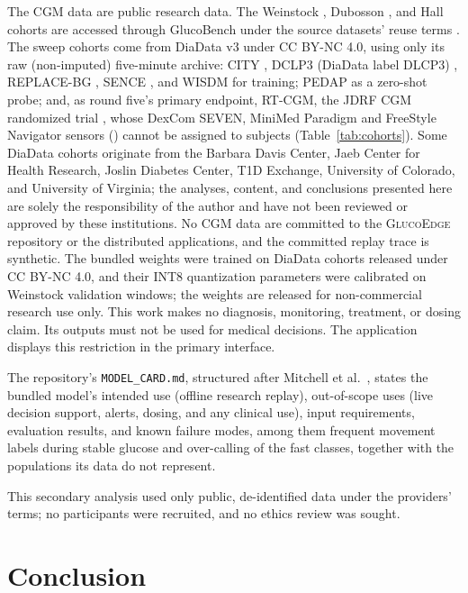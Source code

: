 \documentclass[10pt,twocolumn]{article}
\newcommand{\project}{\textsc{GlucoEdge}\xspace}
\begin{document}
The CGM data are public research data. The Weinstock
\cite{weinstock2016risk}, Dubosson \cite{dubosson2018d1namo}, and Hall
\cite{hall2018glucotypes} cohorts are accessed through GlucoBench under the
source datasets' reuse terms \cite{sergazinov2024glucobench}. The sweep
cohorts come from DiaData v3 \cite{cinar2026diadata} under CC BY-NC 4.0,
using only its raw (non-imputed) five-minute archive: CITY
\cite{laffel2020city}, DCLP3 (DiaData label DLCP3) \cite{brown2019closedloop},
REPLACE-BG \cite{aleppo2017replacebg}, SENCE \cite{sence2021cgm}, and WISDM
\cite{pratley2020wisdm} for training; PEDAP \cite{wadwa2023pedap} as a
zero-shot probe; and, as round five's primary endpoint, RT-CGM, the JDRF
CGM randomized trial \cite{jdrf2008cgm}, whose DexCom SEVEN, MiniMed
Paradigm and FreeStyle Navigator sensors ()
cannot be assigned to subjects (Table~\ref{tab:cohorts}). Some DiaData cohorts originate from the
Barbara Davis Center, Jaeb Center for Health Research, Joslin Diabetes
Center, T1D Exchange, University of Colorado, and University of Virginia;
the analyses, content, and conclusions presented here are solely the
responsibility of the author and have not been reviewed or approved by
these institutions. No CGM data are committed to the \project repository
or the distributed applications, and the committed replay trace is
synthetic. The bundled weights were trained on DiaData cohorts released
under CC BY-NC 4.0, and their INT8 quantization parameters were calibrated
on Weinstock validation windows; the weights are released for
non-commercial research use only. This work makes no diagnosis,
monitoring, treatment, or dosing claim. Its outputs must not be used for
medical decisions. The application displays this restriction in the
primary interface.

The repository's \texttt{MODEL\_CARD.md}, structured after Mitchell et
al.\ \cite{mitchell2019modelcards}, states the bundled model's intended
use (offline research replay), out-of-scope uses (live decision support,
alerts, dosing, and any clinical use), input requirements, evaluation
results, and known failure modes, among them frequent movement labels
during stable glucose and over-calling of the fast classes, together with
the populations its data do not represent.

This secondary analysis used only public, de-identified data under the
providers' terms; no participants were recruited, and no ethics review
was sought.

\section{Conclusion}
\end{document}
